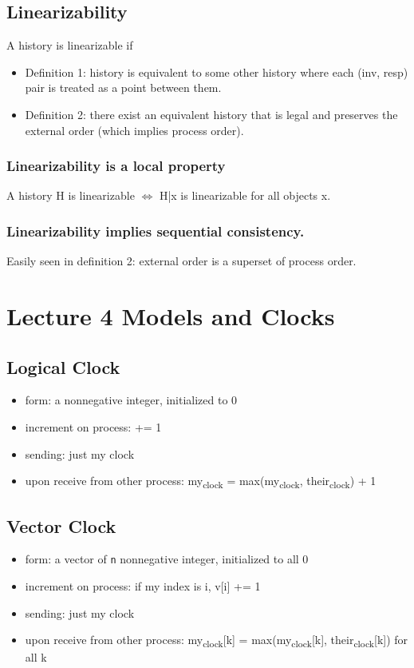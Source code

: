 \documentclass[11pt]{article}
\begin{document}
\subsection{Linearizability}
\label{sec:org08e0744}
A history is linearizable if
\begin{itemize}
\item Definition 1: history is equivalent to some other history where each (inv,
resp) pair is treated as a point between them.
\item Definition 2: there exist an equivalent history that is legal and preserves
the external order (which implies process order).
\end{itemize}
\subsubsection{Linearizability is a local property}
\label{sec:org0f145b3}
A history H is linearizable \(\iff\) H|x is linearizable for all objects x.
\subsubsection{Linearizability implies sequential consistency.}
\label{sec:orgc48e2a7}
Easily seen in definition 2: external order is a superset of process order.
\section{Lecture 4 Models and Clocks}
\label{sec:org4616b34}
\subsection{Logical Clock}
\label{sec:org02beb19}
\begin{itemize}
\item form: a nonnegative integer, initialized to 0
\item increment on process: += 1
\item sending: just my clock
\item upon receive from other process: my\textsubscript{clock} = max(my\textsubscript{clock}, their\textsubscript{clock}) + 1
\end{itemize}
\subsection{Vector Clock}
\label{sec:orgd0953b4}
\begin{itemize}
\item form: a vector of \texttt{n} nonnegative integer, initialized to all 0
\item increment on process: if my index is i, v[i] += 1
\item sending: just my clock
\item upon receive from other process: my\textsubscript{clock}[k] = max(my\textsubscript{clock}[k],
their\textsubscript{clock}[k]) for all k
\end{itemize}
\end{document}
